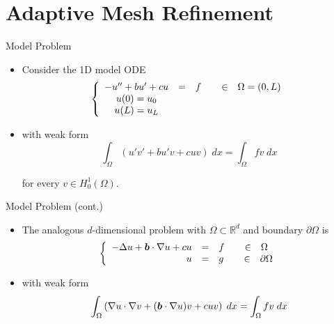 \section{Adaptive Mesh Refinement}
\begin{frame}{Model Problem}
\begin{itemize}
  \item Consider the 1D model ODE
    \begin{equation}
      \left\{
	\begin{array}{ccc}
	  -u'' + bu' +cu &=& f \hspace{.25in} \in \hspace{.1in} \Omega = (0,L) \\
	  u(0) =  u_0   && \\
	  u(L) =  u_L	&&
	\end{array}
	\right.
    \end{equation}

  \item with weak form
    \begin{equation}
      \int_{\Omega} \left( u' v' + b u' v + cuv \right) \; dx = \int_{\Omega} fv \; dx
    \end{equation}

    for every $v \in H^1_0 (\Omega)$.
\end{itemize}
\end{frame}


\begin{frame}{Model Problem (cont.)}
\begin{itemize}
\item The analogous $d$-dimensional problem with $\Omega \subset \mathbb{R}^d$
  and boundary $\partial \Omega$ is
    \begin{equation}
      \left\{
	\begin{array}{ccl}
	  -\Delta u + \bv{b} \cdot \nabla u + cu &=& f
	  \hspace{.25in} \in \hspace{.1in} \Omega  \\
	  \phantom{-\Delta u + \bv{b} \cdot \nabla u + c}u & = & g
	  \hspace{.25in} \in \hspace{.1in} \partial \Omega
	\end{array}
	\right.
    \end{equation}

  \item with weak form
    \begin{equation}
      \int_{\Omega} \left( \nabla u \cdot \nabla v + ({\boldsymbol{b}} \cdot \nabla u) v + cuv \right) \; dx = \int_{\Omega} fv \; dx
    \end{equation}

\end{itemize}

\end{frame}


